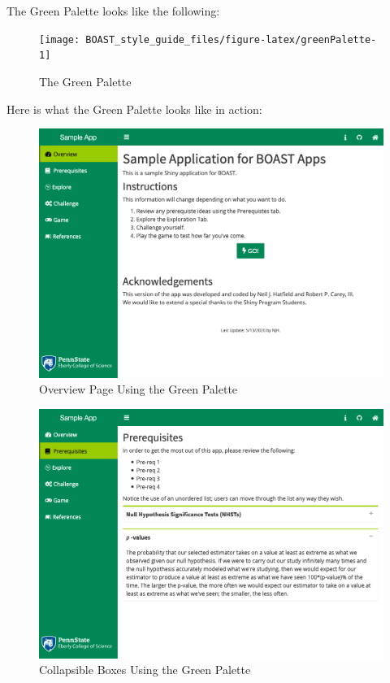 \documentclass[
]{book}
\begin{document}
The Green Palette looks like the following:

\begin{figure}

{\centering \texttt{[image: BOAST\_style\_guide\_files/figure-latex/greenPalette-1]} 

}

\caption{The Green Palette}\label{fig:greenPalette}
\end{figure}

Here is what the Green Palette looks like in action:

\begin{figure}

{\centering \includegraphics[width=14in]{images/greenOverview} 

}

\caption{Overview Page Using the Green Palette}\label{fig:greenAction1}
\end{figure}

\begin{figure}

{\centering \includegraphics[width=14in]{images/greenCollapse} 

}

\caption{Collapsible Boxes Using the Green Palette}\label{fig:greenAction2}
\end{figure}
\end{document}
